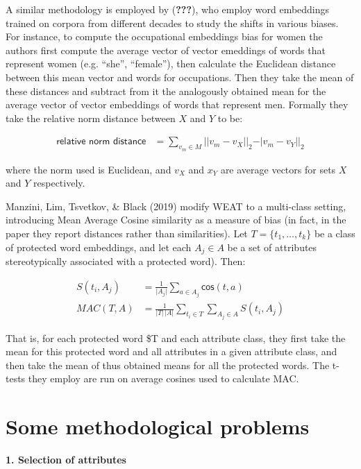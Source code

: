 \documentclass[10pt,dvipsnames,enabledeprecatedfontcommands]{scrartcl}
\begin{document}
A similar methodology is employed by ({\textbf{???}}), who employ word
embeddings trained on corpora from different decades to study the shifts
in various biases. For instance, to compute the occupational embeddings
bias for women the authors first compute the average vector of vector
emeddings of words that represent women (e.g. ``she'', ``female''), then
calculate the Euclidean distance between this mean vector and words for
occupations. Then they take the mean of these distances and subtract
from it the analogously obtained mean for the average vector of vector
embeddings of words that represent men. Formally they take the relative
norm distance between \(X\) and \(Y\) to be:

\begin{align}
\textsf{relative norm distance} & = \sum_{v_m\in M} \vert \vert v_m - v_X\vert \vert_2 - \vert v_m - v_Y\vert \vert_2
\end{align}

\noindent where the norm used is Euclidean, and \(v_X\) and \(x_Y\) are
average vectors for sets \(X\) and \(Y\) respectively.

Manzini, Lim, Tsvetkov, \& Black (2019) modify WEAT to a multi-class
setting, introducing Mean Average Cosine similarity as a measure of bias
(in fact, in the paper they report distances rather than similarities).
Let \(T = \{t_1, \dots, t_k\}\) be a class of protected word embeddings,
and let each \(A_j\in A\) be a set of attributes stereotypically
associated with a protected word). Then:

\begin{align}
S(t_i, A_j) & = \frac{1}{\vert A_j\vert}\sum_{a\in A_j}\mathsf{cos}(t,a) \\
MAC(T,A) & = \frac{1}{\vert T \vert \,\vert A\vert}\sum_{t_i \in T }\sum_{A_j \in A} S(t_i,A_j)
\end{align}

That is, for each protected word \$T and each attribute class, they
first take the mean for this protected word and all attributes in a
given attribute class, and then take the mean of thus obtained means for
all the protected words. The t-tests they employ are run on average
cosines used to calculate MAC.

\section{Some methodological
problems}\label{some-methodological-problems}

\textbf{1. Selection of attributes}
\end{document}
